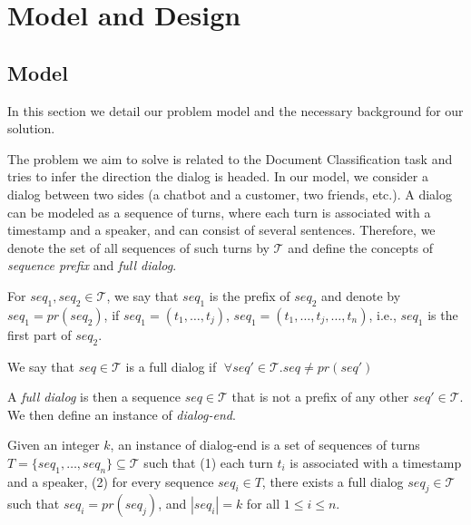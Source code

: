 \section{Model and Design}\label{sec:model}

\subsection{Model}
In this section we detail our problem model and the necessary background 
for our solution.

The problem we aim to solve is related to the Document Classification task 
\cite{attention,Slonim:2002:UDC:564376.564401,DBLP:journals/tkde/IsaLKR08} 
and tries to infer the direction the dialog is headed. 
In our model, we consider a dialog between two sides (a chatbot and a customer, two friends, etc.). 
A dialog can be modeled as a sequence of turns, 
where each turn is associated with a timestamp and a speaker, and can consist of several sentences. 
Therefore, we denote the set of all sequences of 
such turns by $\mathcal{T}$ and define the concepts of {\em sequence prefix} and {\em full dialog}. 

\begin{definition}
For $seq_1, seq_2 \in \mathcal{T}$, we say that $seq_1$ is the 
prefix of $seq_2$ and denote by $seq_1 = pr(seq_2)$, if 
$seq_1 = (t_1, \ldots, t_j)$, $seq_1 = (t_1, \ldots, t_j, \ldots, t_n)$, i.e., $seq_1$ is the 
first part of $seq_2$. 

We say that $seq \in \mathcal{T}$ is a full dialog if $\;\forall seq' \in \mathcal{T}. seq \neq pr(seq')\; $ 
\end{definition}

A {\em full dialog} is then a sequence $seq \in \mathcal{T}$ that is not a prefix 
of any other $seq' \in \mathcal{T}$. 
We then define an instance of {\em dialog-end}. 

\begin{definition}\label{def:target}
Given an integer $k$, an instance of dialog-end is a set of sequences of turns $T=\{seq_1, \ldots, seq_n\} \subseteq \mathcal{T}$ such that 
(1) each turn $t_i$ is associated with a timestamp and a speaker, (2) for every sequence $seq_i\in T$, there exists a full dialog $seq_j\in \mathcal{T}$ such that $seq_i = pr(seq_j)$, and $|seq_i| = k$ for all $1\leq i \leq n$.
\end{definition}

